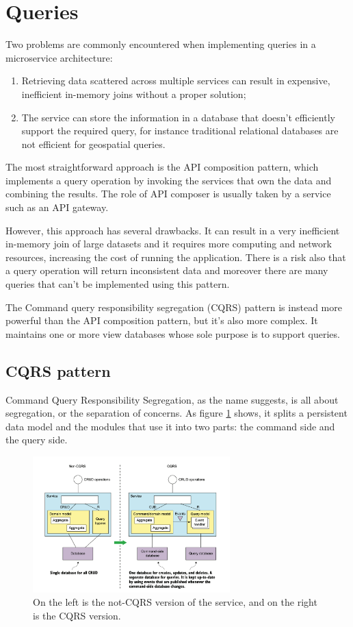 \documentclass[conference]{IEEEtran}
\begin{document}
\section{Queries}

Two problems are commonly encountered when implementing queries in a microservice architecture:

\begin{enumerate}
  \item Retrieving data scattered across multiple services can result in expensive, inefficient in-memory joins without a proper solution;
  \item The service can store the information in a database that doesn’t efficiently support the required query, for instance traditional relational databases are not efficient for geospatial queries.
\end{enumerate}

The most straightforward approach is the API composition pattern, which implements a query operation by invoking the services that own the data and combining the results. The role of API composer is usually taken by a service such as an API gateway.

However, this approach has several drawbacks. It can result in a very inefficient in-memory join of large datasets and it requires more computing and network resources, increasing the cost of running the application. There is a risk also that a query operation will return inconsistent data and moreover there are many queries that can't be implemented using this pattern. \cite{microservices-patterns-api-composition}

The Command query responsibility segregation (CQRS) pattern is instead more powerful than the API composition pattern, but it's also more complex. It maintains one or more view databases whose sole purpose is to support queries.

\subsection{CQRS pattern}

Command Query Responsibility Segregation, as the name suggests, is all about segregation, or the separation of concerns. As figure \ref{cqrs} shows, it splits a persistent data model and the modules that use it into two parts: the command side and the query side.

\begin{figure}[!htbp]
\centering
\includegraphics[width=3in]{jpeg/cqrs}
\caption{On the left is the not-CQRS version of the service, and on the right is the CQRS version. \cite{microservices-patterns-cqrs}}
\label{cqrs}
\end{figure}
\end{document}
